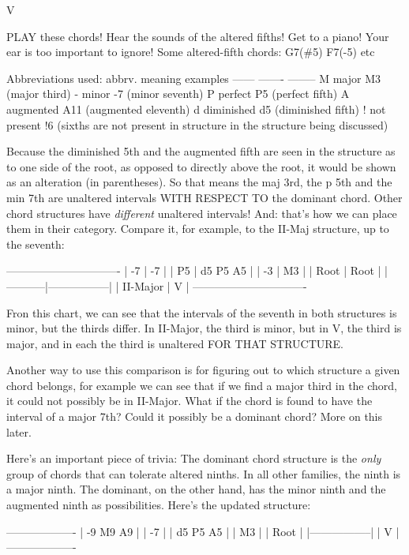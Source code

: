         V

PLAY these chords! Hear the sounds of the altered fifths! Get to a piano! Your
ear is too important to ignore! Some altered-fifth chords: G7(\#5) F7(-5) etc

Abbreviations used: 
abbrv.  meaning           examples
------  -------           --------
  M      major         M3 (major third)
  -      minor         -7 (minor seventh)
  P      perfect       P5 (perfect fifth)
  A     augmented     A11 (augmented eleventh)
  d     diminished     d5 (diminished fifth)
  !     not present    !6 (sixths are not present
        in structure       in the structure being
                           discussed)

Because the diminished 5th and the augmented fifth are seen in the structure as
to one side of the root, as opposed to directly above the root, it would be 
shown as an alteration (in parentheses). So that means the maj 3rd, the p 5th
and the min 7th are unaltered intervals WITH RESPECT TO the dominant chord.
Other chord structures have \emph{different} unaltered intervals! And: that's how
we can place them in their category. Compare it, for example, to the II-Maj
structure, up to the seventh:

-------------------------------
|    -7     |       -7        |
|    P5     |  d5   P5   A5   |
|    -3     |       M3        |
|   Root    |      Root       |
|-----------|-----------------|
| II-Major  |        V        |
-------------------------------

Fron this chart, we can see that the intervals of the seventh in both
structures is minor, but the thirds differ. In II-Major, the third is
minor, but in V, the third is major, and in each the third is unaltered
FOR THAT STRUCTURE.

Another way to use this comparison is for figuring out to which structure
a given chord belongs, for example we can see that if we find a major
third in the chord, it could not possibly be in II-Major. What if the
chord is found to have the interval of a major 7th? Could it possibly
be a dominant chord? More on this later.

Here's an important piece of trivia: The dominant chord structure is the
\emph{only} group of chords that can tolerate altered ninths. In all other
families, the ninth is a major ninth. The dominant, on the other hand,
has the minor ninth and the augmented ninth as possibilities. Here's the
updated structure:

-------------------
| -9    M9   A9   |
|       -7        |
|  d5   P5   A5   |
|       M3        |
|      Root       |
|-----------------|
|        V        |
-------------------

